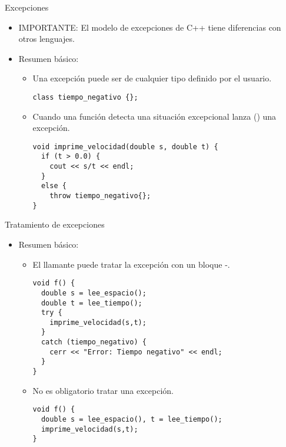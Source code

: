\begin{frame}[fragile]{Excepciones}
\begin{itemize}
  \item \alert{IMPORTANTE}: El modelo de excepciones de C++ tiene diferencias con otros lenguajes.
  \item Resumen básico:
    \begin{itemize}
      \item Una excepción puede ser de cualquier tipo definido por el usuario.
\begin{lstlisting}
class tiempo_negativo {};
\end{lstlisting}
      \item Cuando una función detecta una situación excepcional lanza () una excepción.
\begin{lstlisting}
void imprime_velocidad(double s, double t) {
  if (t > 0.0) {
    cout << s/t << endl;
  }
  else {
    throw tiempo_negativo{};
}
\end{lstlisting}
    \end{itemize}
\end{itemize}
\end{frame}

\begin{frame}[fragile]{Tratamiento de excepciones}
\begin{itemize}
  \item Resumen básico:
    \begin{itemize}
      \item El llamante puede tratar la excepción con un bloque -.
\begin{lstlisting}
void f() {
  double s = lee_espacio();
  double t = lee_tiempo();
  try {
    imprime_velocidad(s,t);
  }
  catch (tiempo_negativo) {
    cerr << "Error: Tiempo negativo" << endl;
  }
}
\end{lstlisting}
      \item No es obligatorio tratar una excepción.
\begin{lstlisting}
void f() {
  double s = lee_espacio(), t = lee_tiempo();
  imprime_velocidad(s,t);
}
\end{lstlisting}
    \end{itemize}
\end{itemize}
\end{frame}

